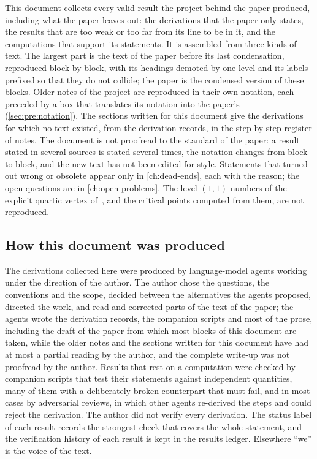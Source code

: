 This document collects every valid result the project behind the paper produced, including what the paper leaves out: the derivations that the paper only states, the results that are too weak or too far from its line to be in it, and the computations that support its statements.
It is assembled from three kinds of text.
The largest part is the text of the paper before its last condensation, reproduced block by block, with its headings demoted by one level and its labels prefixed so that they do not collide; the paper is the condensed version of these blocks.
Older notes of the project are reproduced in their own notation, each preceded by a box that translates its notation into the paper's (\cref{sec:pre:notation}).
The sections written for this document give the derivations for which no text existed, from the derivation records, in the step-by-step register of notes.
The document is not proofread to the standard of the paper: a result stated in several sources is stated several times, the notation changes from block to block, and the new text has not been edited for style.
Statements that turned out wrong or obsolete appear only in \cref{ch:dead-ends}, each with the reason; the open questions are in \cref{ch:open-problems}.
The level-$(1, 1)$ numbers of the explicit quartic vertex of~\cite{Erbin:2026:SL2CVerticesClosed}, and the critical points computed from them, are not reproduced.

\subsection{How this document was produced}
\label{sec:pre:disclosure}

The derivations collected here were produced by language-model agents working under the direction of the author.
The author chose the questions, the conventions and the scope, decided between the alternatives the agents proposed, directed the work, and read and corrected parts of the text of the paper; the agents wrote the derivation records, the companion scripts and most of the prose, including the draft of the paper from which most blocks of this document are taken, while the older notes and the sections written for this document have had at most a partial reading by the author, and the complete write-up was not proofread by the author.
Results that rest on a computation were checked by companion scripts that test their statements against independent quantities, many of them with a deliberately broken counterpart that must fail, and in most cases by adversarial reviews, in which other agents re-derived the steps and could reject the derivation.
The author did not verify every derivation.
The status label of each result records the strongest check that covers the whole statement, and the verification history of each result is kept in the results ledger.
Elsewhere \enquote{we} is the voice of the text.

